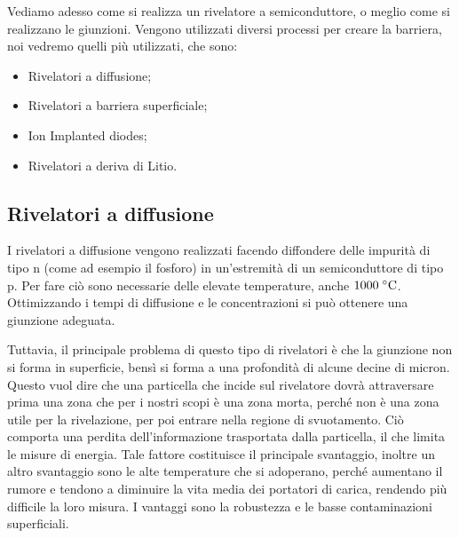 \vspace{0.2cm}Vediamo adesso come si realizza un rivelatore a semiconduttore, o meglio come si realizzano le giunzioni. Vengono utilizzati diversi processi per creare la barriera, noi vedremo quelli più utilizzati, che sono:

\begin{itemize}
   \item Rivelatori a diffusione;
   \item Rivelatori a barriera superficiale;
   \item Ion Implanted diodes;
   \item Rivelatori a deriva di Litio.
\end{itemize}

\subsection{Rivelatori a diffusione}
I rivelatori a diffusione vengono realizzati facendo diffondere delle impurità di tipo n (come ad esempio il fosforo) in un'estremità di un semiconduttore di tipo p. Per fare ciò sono necessarie delle elevate temperature, anche $1000 \; ^{\circ}\rm C$. Ottimizzando i tempi di diffusione e le concentrazioni si può ottenere una giunzione adeguata.
\begin{figure}[H]
   \centering
 \end{figure}
Tuttavia, il principale problema di questo tipo di rivelatori è che la giunzione non si forma in superficie, bensì si forma a una profondità di alcune decine di micron. Questo vuol dire che una particella che incide sul rivelatore dovrà attraversare prima una zona che per i nostri scopi è una zona morta, perché non è una zona utile per la rivelazione, per poi entrare nella regione di svuotamento. Ciò comporta una perdita dell'informazione trasportata dalla particella, il che limita le misure di energia. Tale fattore costituisce il principale svantaggio, inoltre un altro svantaggio sono le alte temperature che si adoperano, perché aumentano il rumore e tendono a diminuire la vita media dei portatori di carica, rendendo più difficile la loro misura. I vantaggi sono la robustezza e le basse contaminazioni superficiali.

